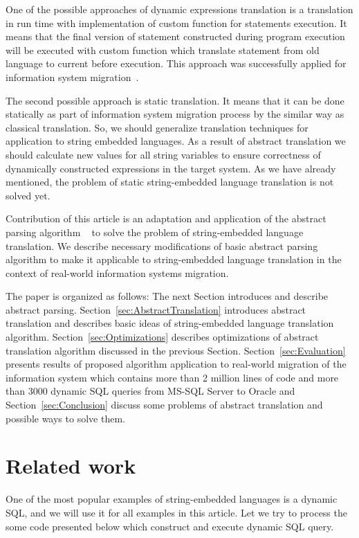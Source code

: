 \documentclass{llncs}
\begin{document}
One of the possible approaches of dynamic expressions translation is a translation in run time with implementation of custom function for statements execution. It means that the final version of statement constructed during program execution will be executed with custom function which translate statement from old language to current before execution. This approach was successfully applied for information system migration~\cite{OpenSystemsDBMS}.

The second possible approach is static translation. It means that it can be done statically as part of information system migration process by the similar way as classical translation. So,  we should generalize translation techniques for application to string embedded languages.  As a result of abstract translation we should calculate new values for all string variables to ensure   correctness of dynamically constructed expressions in the target system. As we have already mentioned, the problem of static string-embedded language translation is not solved yet.

Contribution of this article is an adaptation and application of the abstract parsing algorithm ~\cite{AbstrParsing} to solve the problem of string-embedded language translation. We describe necessary modifications of basic abstract parsing algorithm to make it applicable to string-embedded language translation in the context of real-world information systems migration. 

The paper is organized as follows: The next Section introduces and describe abstract parsing. Section~\ref{sec:AbstractTranslation} introduces abstract translation and describes basic ideas of string-embedded language translation algorithm. Section~\ref{sec:Optimizations} describes optimizations of abstract translation algorithm discussed in the previous Section. Section~\ref{sec:Evaluation} presents results of proposed algorithm application to real-world migration of the information system which contains more than 2 million lines of code and more than 3000 dynamic SQL queries from MS-SQL Server to Oracle and Section~\ref{sec:Conclusion} discuss some problems of abstract translation and possible ways to solve them.




\section{Related work}
\label{sec:RelatedWork}

One of the most popular examples of string-embedded languages is a dynamic SQL, and we will use it for all examples in this article. Let we try to process the some code presented below which construct and execute dynamic SQL query.  
\end{document}

